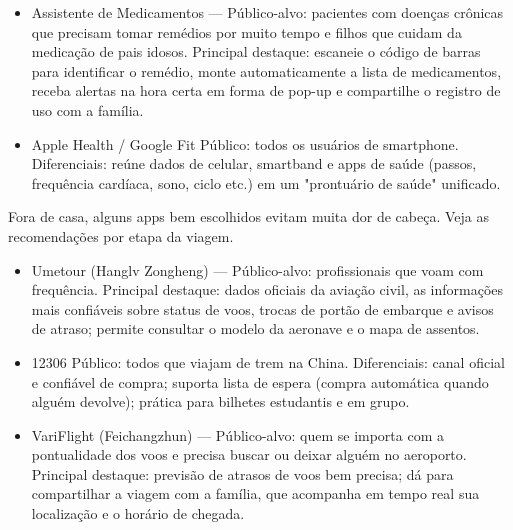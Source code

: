 
\begin{itemize}
  \item Assistente de Medicamentos — Público-alvo: pacientes com doenças crônicas que precisam tomar remédios por muito tempo e filhos que cuidam da medicação de pais idosos. Principal destaque: escaneie o código de barras para identificar o remédio, monte automaticamente a lista de medicamentos, receba alertas na hora certa em forma de pop-up e compartilhe o registro de uso com a família.
\end{itemize}


\begin{itemize}
  \item Apple Health / Google Fit Público: todos os usuários de smartphone. Diferenciais: reúne dados de celular, smartband e apps de saúde (passos, frequência cardíaca, sono, ciclo etc.) em um "prontuário de saúde" unificado.
\end{itemize}


Fora de casa, alguns apps bem escolhidos evitam muita dor de cabeça. Veja as recomendações por etapa da viagem.


\begin{itemize}
  \item Umetour (Hanglv Zongheng) — Público-alvo: profissionais que voam com frequência. Principal destaque: dados oficiais da aviação civil, as informações mais confiáveis sobre status de voos, trocas de portão de embarque e avisos de atraso; permite consultar o modelo da aeronave e o mapa de assentos.
  \item 12306 Público: todos que viajam de trem na China. Diferenciais: canal oficial e confiável de compra; suporta lista de espera (compra automática quando alguém devolve); prática para bilhetes estudantis e em grupo.
  \item VariFlight (Feichangzhun) — Público-alvo: quem se importa com a pontualidade dos voos e precisa buscar ou deixar alguém no aeroporto. Principal destaque: previsão de atrasos de voos bem precisa; dá para compartilhar a viagem com a família, que acompanha em tempo real sua localização e o horário de chegada.
\end{itemize}


